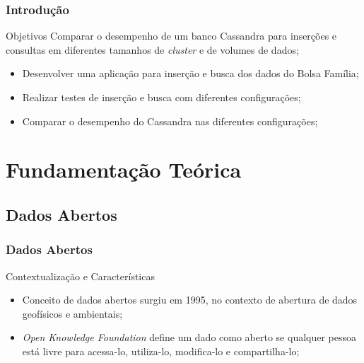\documentclass[brazil]{beamer}
\begin{document}
\begin{frame}
\frametitle{Introdução}

\begin{block}{Objetivos}
	Comparar o desempenho de um banco Cassandra para inserções e consultas em diferentes tamanhos de \emph{cluster} e de volumes de dados;
	
	\begin{itemize}
		\item Desenvolver uma aplicação para inserção e busca dos dados do Bolsa Família;
		\item Realizar testes de inserção e busca com diferentes configurações;
		\item Comparar o desempenho do Cassandra nas diferentes configurações;
	\end{itemize}
\end{block}
\end{frame}

\section{Fundamentação Teórica}

\subsection{Dados Abertos}

\begin{frame}
	\frametitle{Dados Abertos}
	\begin{block}{Contextualização e Características}
		\begin{itemize}
			\item Conceito de dados abertos surgiu em 1995, no contexto de abertura de dados geofísicos e ambientais;
			\item \emph{Open Knowledge Foundation} define um dado como aberto se qualquer pessoa está livre para acessa-lo, utiliza-lo, modifica-lo e compartilha-lo;
		\end{itemize}
	\end{block}
\end{frame}
	
\end{document}
